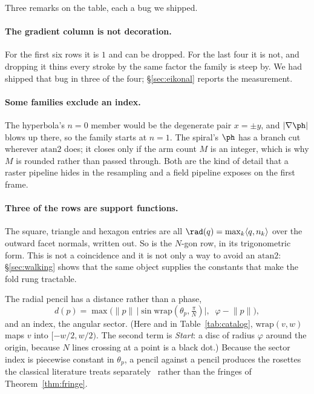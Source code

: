 Three remarks on the table, each a bug we shipped.

\paragraph{The gradient column is not decoration.} For the first six rows it is
$1$ and can be dropped. For the last four it is not, and dropping it thins every
stroke by the same factor the family is steep by. We had shipped that bug in
three of the four; \S\ref{sec:eikonal} reports the measurement.

\paragraph{Some families exclude an index.} The hyperbola's $n=0$ member would be
the degenerate pair $x=\pm y$, and $\lvert\nabla\ph\rvert$ blows up there, so the
family starts at $n=1$. The spiral's $\ph$ has a branch cut wherever
$\mathrm{atan2}$ does; it closes only if the arm count $M$ is an integer, which is
why $M$ is rounded rather than passed through. Both are the kind of detail that a
raster pipeline hides in the resampling and a field pipeline exposes on the
first frame.

\paragraph{Three of the rows are support functions.} The square, triangle and
hexagon entries are all $\rad(q)=\max_k\langle q,n_k\rangle$ over the outward
facet normals, written out. So is the $N$-gon row, in its trigonometric form. This
is not a coincidence and it is not only a way to avoid an $\mathrm{atan2}$:
\S\ref{sec:walking} shows that the same object supplies the constants that make
the fold rung tractable.

The radial pencil has a distance rather than a phase,
\begin{equation}
  d(p)=\max\!\Big(\lVert p\rVert\,\big\lvert\sin\mathrm{wrap}(\theta_p,\tfrac{\pi}{N})\big\rvert,
  \;\; \varphi-\lVert p\rVert\Big),
  \label{eq:radial}
\end{equation}
and an index, the angular sector. (Here and in Table~\ref{tab:catalog},
$\mathrm{wrap}(v,w)$ maps $v$ into $[-w/2,w/2)$. The second term is
\emph{Start}: a disc of radius $\varphi$ around the origin, because $N$
lines crossing at a point is a black dot.) Because the sector index is
piecewise constant in $\theta_p$, a pencil against a pencil produces
the rosettes the classical literature treats
separately~\cite{Amidror2009Theory} rather than the fringes of
Theorem~\ref{thm:fringe}.

